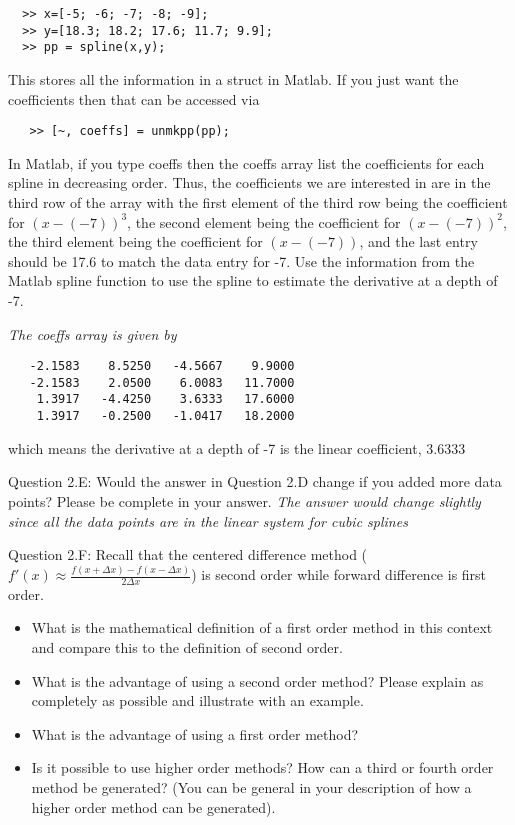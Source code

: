 \documentclass{article}
\def\ds{\displaystyle}
\begin{document}
\begin{verbatim}
  >> x=[-5; -6; -7; -8; -9];
  >> y=[18.3; 18.2; 17.6; 11.7; 9.9];
  >> pp = spline(x,y);
\end{verbatim}
This stores all the information in a struct in Matlab. If you just want the coefficients then that can be accessed via
\begin{verbatim}
   >> [~, coeffs] = unmkpp(pp);
\end{verbatim}
In Matlab, if you type coeffs then the coeffs array list the coefficients for each spline in decreasing order. Thus, the coefficients we are interested in are in the third row of the array with the first element of the third row being the coefficient for $\ds  (x-(-7))^3$, the second element being the coefficient for $\ds  (x-(-7))^2$, the third element  being the coefficient for $\ds  (x-(-7))$, and the last entry should be 17.6 to match the data entry for -7. Use the information from the Matlab spline function to use the spline to estimate the derivative at a depth of -7. 
{\it \color{teal} The coeffs array is given by
\begin{verbatim}
   -2.1583    8.5250   -4.5667    9.9000
   -2.1583    2.0500    6.0083   11.7000
    1.3917   -4.4250    3.6333   17.6000
    1.3917   -0.2500   -1.0417   18.2000
\end{verbatim}
which means the derivative at a depth of -7 is the linear coefficient, 3.6333}
\medskip \par \noindent
%
Question 2.E: Would the answer in Question 2.D change if you added more data points?  Please be complete in your answer. {\it \color{teal}The answer would change slightly since all the data points are in the linear system for cubic splines}  
\medskip \par \noindent
%
Question 2.F: Recall that the centered difference method ($\ds f'(x) \approx \frac {f(x+\Delta x) - f(x-\Delta x)}{2\Delta x}$) is second order while forward difference is first order. 
\begin{itemize}
    \item What is the mathematical definition of a first order method in this context and compare this to the definition of second order. 
    \item What is the advantage of using a second order method? Please explain as completely as possible and illustrate with an example. 
    \item What is the advantage of using a first order method? 
    \item Is it possible to use higher order methods?  How can a third or fourth order method be generated? (You can be general in your description of how a higher order method can be generated). 
\end{itemize}
\end{document}
